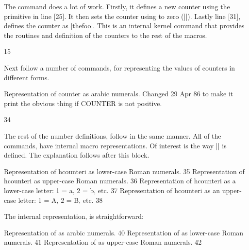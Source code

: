 \begin{multicols}{2}
\par
The command does a lot of work. Firstly, it defines a new counter using the \tex primitive  in line [25]. It then sets the counter using  to zero (|\z@|). Lastly line [31], defines the counter as |thefoo|. This is an internal kernel command that provides the routines and definition of the counters to the rest of the macros.

\begin{Code}
15 \def\@newctr#1[#2]{%
16 \@ifundefined{c@#2}{\@nocounterr{#2}}{\@addtoreset{#1}{#2}}}
\end{Code}


Next follow a number of commands, for representing the values of counters in different forms.

 Representation of counter as arabic numerals. Changed 29 Apr 86 to make it
print the obvious thing if COUNTER is not positive.

\begin{Code}
34 \def\arabic#1{\expandafter\@arabic\csname c@#1\endcsname}
\end{Code}

The rest of the number definitions, follow in the same manner.  All of the commands, have internal macro representations. Of interest is the way |\Roman| is defined. The explanation follows after this block.

\begin{Code}
\roman Representation of hcounteri as lower-case Roman numerals.
35 \def\roman#1{\expandafter\@roman\csname c@#1\endcsname}
\Roman Representation of hcounteri as upper-case Roman numerals.
36 \def\Roman#1{\expandafter\@Roman\csname c@#1\endcsname}
\alph Representation of hcounteri as a lower-case letter: 1 = a, 2 = b, etc.
37 \def\alph#1{\expandafter\@alph\csname c@#1\endcsname}
\Alph Representation of hcounteri as an upper-case letter: 1 = A, 2 = B, etc.
38 \def\Alph#1{\expandafter\@Alph\csname c@#1\endcsname}
\end{Code}

The internal representation, is straightforward:

\begin{Code}
\@arabic \@arabic\FOOcounter Representation of \FOOcounter as arabic numerals.
40 \def\@arabic#1{\number #1} %
\@roman \@roman\FOOcounter Representation of \FOOcounter as lower-case Roman numerals.
41 \def\@roman#1{\romannumeral #1}
\@Roman \@Roman\FOOcounter Representation of \FOOcounter as upper-case Roman numerals.
42 \def\@Roman#1{\expandafter\@slowromancap\romannumeral #1@}
\end{Code}




\end{multicols}
